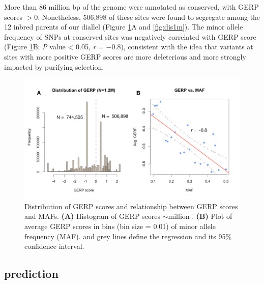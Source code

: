 \documentclass[9pt,twocolumn,twoside]{gsajnl}
\begin{document}
More than 86 million bp of the genome were annotated as conserved, with GERP scores $>0$.
Nonetheless, 506,898 of these sites were found to segregate among the 12 inbred parents of our diallel (Figure \ref{fig:gerpmaf}A and \ref{fig:dis1m}).
The minor allele frequency of SNPs at conserved sites was negatively correlated with GERP score (Figure \ref{fig:gerpmaf}B; \emph{P} value < 0.05, \emph{r} = $-0.8$), consistent with the idea that variants at sites with more positive GERP scores are more deleterious and more strongly impacted by purifying selection.

\begin{figure}[htbp]
\centering
\includegraphics[width=\linewidth]{Figure_gerpmaf.pdf}
\caption{Distribution of GERP scores and relationship between GERP scores and MAFs. \textbf{(A)} Histogram of GERP scores \DIFdelbeginFL {}\DIFdelendFL \DIFaddbeginFL {}\DIFaddendFL $\sim$\DIFdelbeginFL {}\DIFdelendFL \DIFaddbeginFL {}\DIFaddendFL million \DIFdelbeginFL {}\DIFdelendFL \DIFaddbeginFL {}\DIFaddendFL . \DIFdelbeginFL \DIFdelendFL \textbf{(B)} Plot of average GERP scores in bins (bin size = 0.01) of minor allele frequency (MAF). \DIFdelbeginFL {}\DIFdelendFL \DIFaddbeginFL {}\DIFaddendFL and grey lines define the regression and its 95\% confidence interval.}
\label{fig:gerpmaf}
\end{figure}


\subsection*{\DIFdelbegin {}\DIFdelend \DIFaddbegin {}\DIFaddend prediction\DIFdelbegin {}\DIFdelend }
\end{document}
